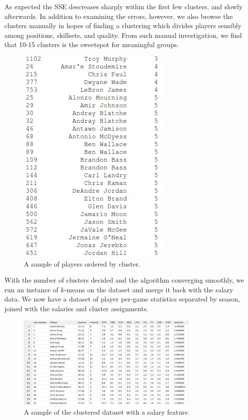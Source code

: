 \documentclass{article}
\begin{document}
As expected the SSE descreases sharply within the first few clusters, and slowly afterwards. In addition to examining the errors, however, we also browse the clusters manually in hopes of finding a clustering which divides players sensibly among positions, skillsets, and quality. From such manual investigation, we find that 10-15 clusters is the sweetspot for meaningful groups.

\begin{figure}[h!]
    \centering
    \includegraphics[scale=0.5]{sensicalcluster.jpeg}
    \caption{A sample of players ordered by cluster.}
\end{figure}

With the number of clusters decided and the algorithm converging smoothly, we run an instance of $k$-means on the dataset and merge it back with the salary data. We now have a dataset of player per-game statistics separated by season, joined with the salaries and cluster assignments.

\begin{figure}[h!]
    \centering
    \includegraphics[width=0.8\textwidth]{sampledata.jpeg}
    \caption{A sample of the clustered dataset with a salary feature.}
\end{figure}
\end{document}

